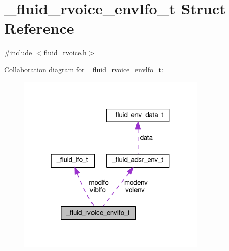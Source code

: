 \hypertarget{struct__fluid__rvoice__envlfo__t}{}\section{\+\_\+fluid\+\_\+rvoice\+\_\+envlfo\+\_\+t Struct Reference}
\label{struct__fluid__rvoice__envlfo__t}


{\ttfamily \#include $<$fluid\+\_\+rvoice.\+h$>$}



Collaboration diagram for \+\_\+fluid\+\_\+rvoice\+\_\+envlfo\+\_\+t\+:
\nopagebreak
\begin{figure}[H]
\begin{center}
\leavevmode
\includegraphics[width=256pt]{struct__fluid__rvoice__envlfo__t__coll__graph}
\end{center}
\end{figure}
